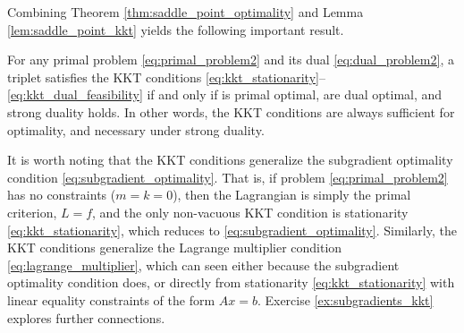 Combining Theorem \ref{thm:saddle_point_optimality} and Lemma
\ref{lem:saddle_point_kkt} yields the following important result. 

\begin{Theorem}
\label{thm:kkt_optimality}
For any primal problem \eqref{eq:primal_problem2} and its dual
\eqref{eq:dual_problem2}, a triplet 
satisfies the KKT conditions
\eqref{eq:kkt_stationarity}--\eqref{eq:kkt_dual_feasibility} if and only if 
 is primal optimal,  are dual
optimal, and strong duality holds. In other words, the KKT conditions are always
sufficient for optimality, and necessary under strong duality.   
\end{Theorem}

It is worth noting that the KKT conditions generalize the subgradient optimality
condition \eqref{eq:subgradient_optimality}. That is, if problem
\eqref{eq:primal_problem2} has no constraints ($m = k = 0$), then the Lagrangian
is simply the primal criterion, $L = f$, and the only non-vacuous KKT condition
is stationarity \eqref{eq:kkt_stationarity}, which reduces to
\eqref{eq:subgradient_optimality}. Similarly, the KKT conditions generalize the
Lagrange multiplier condition \eqref{eq:lagrange_multiplier}, which can seen
either because the subgradient optimality condition does, or directly from
stationarity \eqref{eq:kkt_stationarity} with linear equality constraints of the
form $Ax = b$. Exercise \ref{ex:subgradients_kkt} explores further connections.  

